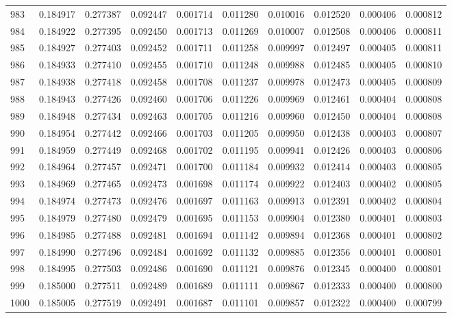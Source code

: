 \begin{tabular}{lrrrrrrrrr}
983 & 0.184917 & 0.277387 & 0.092447 & 0.001714 & 0.011280 & 0.010016 & 0.012520 & 0.000406 & 0.000812 \\
984 & 0.184922 & 0.277395 & 0.092450 & 0.001713 & 0.011269 & 0.010007 & 0.012508 & 0.000406 & 0.000811 \\
985 & 0.184927 & 0.277403 & 0.092452 & 0.001711 & 0.011258 & 0.009997 & 0.012497 & 0.000405 & 0.000811 \\
986 & 0.184933 & 0.277410 & 0.092455 & 0.001710 & 0.011248 & 0.009988 & 0.012485 & 0.000405 & 0.000810 \\
987 & 0.184938 & 0.277418 & 0.092458 & 0.001708 & 0.011237 & 0.009978 & 0.012473 & 0.000405 & 0.000809 \\
988 & 0.184943 & 0.277426 & 0.092460 & 0.001706 & 0.011226 & 0.009969 & 0.012461 & 0.000404 & 0.000808 \\
989 & 0.184948 & 0.277434 & 0.092463 & 0.001705 & 0.011216 & 0.009960 & 0.012450 & 0.000404 & 0.000808 \\
990 & 0.184954 & 0.277442 & 0.092466 & 0.001703 & 0.011205 & 0.009950 & 0.012438 & 0.000403 & 0.000807 \\
991 & 0.184959 & 0.277449 & 0.092468 & 0.001702 & 0.011195 & 0.009941 & 0.012426 & 0.000403 & 0.000806 \\
992 & 0.184964 & 0.277457 & 0.092471 & 0.001700 & 0.011184 & 0.009932 & 0.012414 & 0.000403 & 0.000805 \\
993 & 0.184969 & 0.277465 & 0.092473 & 0.001698 & 0.011174 & 0.009922 & 0.012403 & 0.000402 & 0.000805 \\
994 & 0.184974 & 0.277473 & 0.092476 & 0.001697 & 0.011163 & 0.009913 & 0.012391 & 0.000402 & 0.000804 \\
995 & 0.184979 & 0.277480 & 0.092479 & 0.001695 & 0.011153 & 0.009904 & 0.012380 & 0.000401 & 0.000803 \\
996 & 0.184985 & 0.277488 & 0.092481 & 0.001694 & 0.011142 & 0.009894 & 0.012368 & 0.000401 & 0.000802 \\
997 & 0.184990 & 0.277496 & 0.092484 & 0.001692 & 0.011132 & 0.009885 & 0.012356 & 0.000401 & 0.000801 \\
998 & 0.184995 & 0.277503 & 0.092486 & 0.001690 & 0.011121 & 0.009876 & 0.012345 & 0.000400 & 0.000801 \\
999 & 0.185000 & 0.277511 & 0.092489 & 0.001689 & 0.011111 & 0.009867 & 0.012333 & 0.000400 & 0.000800 \\
1000 & 0.185005 & 0.277519 & 0.092491 & 0.001687 & 0.011101 & 0.009857 & 0.012322 & 0.000400 & 0.000799 \\

\end{tabular}
